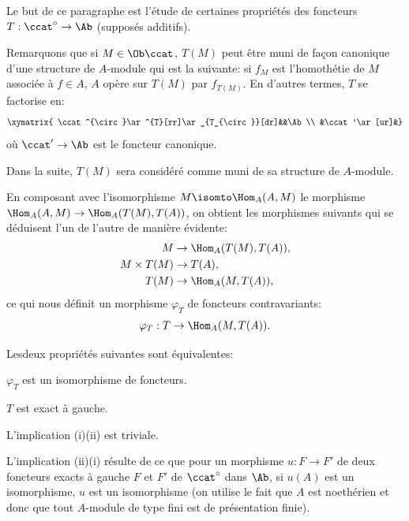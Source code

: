 \smallskip
Le but de ce paragraphe est l'\'etude de certaines propri\'et\'es des foncteurs \hbox{$T: \ccat^{\circ}\to \Ab$} (suppos\'es additifs).

Remarquons que si $M\in \Ob \ccat$, $T(M)$ peut \^etre muni de fa\c
con canonique d'une structure de $A$-module qui est la suivante:
si $f_{M}$ est l'homoth\'etie de $M$ associ\'ee \`a $f\in A$, $A$
op\`ere sur $T(M)$ par $f_{T(M)}$. En d'autres termes, $T$ se
factorise en:
$$
\xymatrix{ \ccat^{\circ}\ar^{T}[rr]\ar_{T_{\circ}}[dr]&&\Ab\\
&\ccat'\ar[ur]&}
$$
o\`u $\ccat'\to \Ab$ est le foncteur canonique.

Dans la suite, $T(M)$ sera consid\'er\'e comme muni de sa structure de $A$-module.

En composant avec l'isomorphisme \hbox{$M\isomto \Hom_{A}(A, M)$} le morphisme $\Hom_{A}(A, M)\to \Hom_{A}(T(M), T(A))$, on obtient les morphismes suivants qui se d\'eduisent l'un de l'autre de mani\`ere \'evidente:
\begin{align*}
M&\to \Hom_{A}(T(M), T(A)),\\
M\times T(M)&\to T(A),\\
T(M)&\to \Hom_{A}(M, T(A)),
\end{align*}
ce qui nous d\'efinit un morphisme $\varphi_{T}$ de foncteurs contravariants:
\begin{eqnarray*}
\varphi_{T}: T\to \Hom_{A}(M, T(A)).
\end{eqnarray*}

\begin{proposition} \label{IV.1.1}
Les\pageoriginale deux propri\'et\'es suivantes sont \'equivalentes:
\begin{enumeratei}
\item
$\varphi_{T}$ est un isomorphisme de foncteurs.

\item
$T$ est exact \`a gauche.
\end{enumeratei}
\end{proposition}

L'implication (i)\ALORS (ii) est triviale.

L'implication (ii)\ALORS (i) r\'esulte de ce que pour un morphisme $u:F\to F'$ de deux foncteurs  exacts \`a gauche $F$ et $F'$ de $\ccat^{\circ}$ dans $\Ab$, si $u(A)$ est un isomorphisme, $u$ est un isomorphisme (on utilise le fait que $A$ est noeth\'erien et donc que tout $A$-module de type fini est de pr\'esentation finie).

